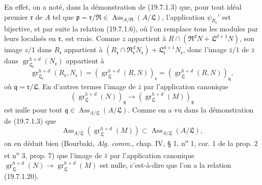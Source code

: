 En effet, on a noté, dans la démonstration de (19.7.1.3) que, pour tout idéal premier $\mathfrak r$ de $A$ tel que $\mathfrak p=\mathfrak r/\mathfrak R\in\operatorname{Ass}_{A/\mathfrak R}(A/\mathfrak L)$, l'application $\psi_{R_{\mathfrak r}}'$ est bijective, et par suite la relation (19.7.1.6), où l'on remplace tous les modules par leurs localisés en $\mathfrak r$, est vraie. Comme $z$ appartient à $R\cap(\mathfrak R^dN+\mathfrak L^{d+1}N)$, son image $z/1$ dans $R_{\mathfrak r}$ appartient à $(R_{\mathfrak r}\cap\mathfrak R_{\mathfrak r}^dN_{\mathfrak r})+\mathfrak L_{\mathfrak r}^{d+1}N_{\mathfrak r}$, donc l'image $\bar z/1$ de $\bar z$ dans $\operatorname{gr}_{\mathfrak L_{\mathfrak r}}^{h+d}(N_{\mathfrak r})$ appartient à
\[
  \operatorname{gr}_{\mathfrak L_{\mathfrak r}}^{h+d}(R_{\mathfrak r},N_{\mathfrak r})
  =(\operatorname{gr}_{\mathfrak L}^{h+d}(R,N))_{\mathfrak r}
  =(\operatorname{gr}_{\mathfrak L}^{h+d}(R,N))_{\mathfrak q},
\]
où $\mathfrak q=\mathfrak r/\mathfrak L$. En d'autres termes l'image de $\bar z$ par l'application canonique
\[
  (\operatorname{gr}_{\mathfrak L}^{h+d}(N))_{\mathfrak q}\longrightarrow(\operatorname{gr}_{\mathfrak L}^{h+d}(M))_{\mathfrak q}
\]
est nulle pour tout $\mathfrak q\in\operatorname{Ass}_{A/\mathfrak L}(A/\mathfrak L)$. Comme on a vu dans la démonstration de (19.7.1.3) que
\[
  \operatorname{Ass}_{A/\mathfrak L}(\operatorname{gr}_{\mathfrak L}^{h+d}(M))\subset\operatorname{Ass}_{A/\mathfrak L}(A/\mathfrak L),
\]
on en déduit bien (Bourbaki, \emph{Alg. comm.}, chap. IV, § 1, n\textsuperscript{o} 1, cor. 1 de la prop. 2 et n\textsuperscript{o} 3, prop. 7) que l'image de $\bar z$ par l'application canonique $\operatorname{gr}_{\mathfrak L}^{h+d}(N)\to\operatorname{gr}_{\mathfrak L}^{h+d}(M)$ est nulle, c'est-à-dire que l'on a la relation (19.7.1.20).

